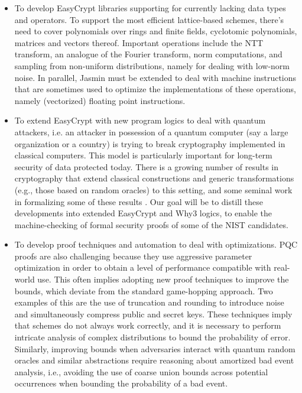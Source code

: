 \documentclass[preprint]{iacrtrans}
\begin{document}
  \begin{itemize}
    \item To develop EasyCrypt libraries supporting for currently
      lacking data types and operators. To support the most efficient
      lattice-based schemes, there's need to cover polynomials over rings
      and finite fields, cyclotomic polynomials, matrices and vectors
      thereof. Important operations include the NTT transform, an analogue
      of the Fourier transform, norm computations, and sampling from
      non-uniform distributions, namely for dealing with low-norm
      noise. In parallel, Jasmin must be extended to deal with machine
      instructions that are sometimes used to optimize the implementations
      of these operations, namely (vectorized) floating point
      instructions.
    \item To extend EasyCrypt with new program logics to deal with quantum
      attackers, i.e. an attacker in possession of a quantum computer (say
      a large organization or a country) is trying to break cryptography
      implemented in classical computers. This model is particularly
      important for long-term security of data protected today. There is a
      growing number of results \cite{PQPR,PQRO} in cryptography that extend
      classical constructions and generic transformations (e.g., those
      based on random oracles) to this setting, and some seminal work in
      formalizing some of these results \cite{PQEC}. Our goal will be to
      distill these developments into extended EasyCrypt and Why3 logics,
      to enable the machine-checking of formal security proofs of some of
      the NIST candidates.
    \item To develop proof techniques and automation to deal with
      optimizations. PQC proofs are also challenging because they use
      aggressive parameter optimization in order to obtain a level of
      performance compatible with real-world use. This often implies
      adopting new proof techniques to improve the bounds, which deviate
      from the standard game-hopping approach. Two examples of this are
      the use of truncation and rounding to introduce noise and
      simultaneously compress public and secret keys. These techniques
      imply that schemes do not always work correctly, and it is necessary
      to perform intricate analysis of complex distributions to bound the
      probability of error. Similarly, improving bounds when adversaries
      interact with quantum random oracles and similar abstractions
      require reasoning about amortized bad event analysis, i.e., avoiding
      the use of coarse union bounds across potential occurrences when
      bounding the probability of a bad event.
  \end{itemize}
\end{document}
